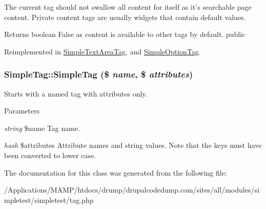 \label{class_simple_tag_a6f1d7a187565b366e995d94da0f16ad4}
The current tag should not swallow all content for itself as it's searchable page content. Private content tags are usually widgets that contain default values. \begin{DoxyReturn}{Returns}
boolean False as content is available to other tags by default.  public 
\end{DoxyReturn}


Reimplemented in \hyperlink{class_simple_text_area_tag_aef83c24c5a19caeea6447b48f2a3243a}{SimpleTextAreaTag}, and \hyperlink{class_simple_option_tag_a94df0c09858c39d2a3e486e70bdbfcfa}{SimpleOptionTag}.\hypertarget{class_simple_tag_a5aca97a1a2ddca4c32bc2d256dc5a9ea}{
\subsubsection[{SimpleTag}]{\setlength{\rightskip}{0pt plus 5cm}SimpleTag::SimpleTag (\$ {\em name}, \/  \$ {\em attributes})}}
\label{class_simple_tag_a5aca97a1a2ddca4c32bc2d256dc5a9ea}
Starts with a named tag with attributes only. 
\begin{DoxyParams}{Parameters}
\item[{\em string}]\$name Tag name. \item[{\em hash}]\$attributes Attribute names and string values. Note that the keys must have been converted to lower case. \end{DoxyParams}


The documentation for this class was generated from the following file:\begin{DoxyCompactItemize}
\item 
/Applications/MAMP/htdocs/drump/drupalcodedump.com/sites/all/modules/simpletest/simpletest/tag.php\end{DoxyCompactItemize}
